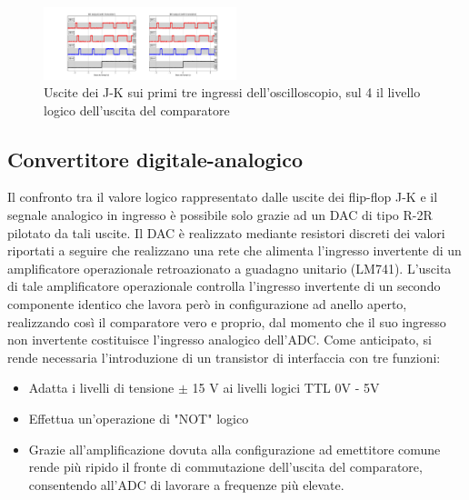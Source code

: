 \documentclass[journal]{IEEEtran}
\begin{document}
\begin{figure}[H]%
\begin{center}
\includegraphics[trim = {570 0 0 0}, clip, width=0.50\textwidth]{analysis/output/cumulative_BIT_with_transistor.pdf}
\caption{Uscite dei J-K sui primi tre ingressi dell'oscilloscopio, sul 4 il livello logico dell'uscita del comparatore}
\label{fig:Comparator-output}
\end{center}
\end{figure}

\subsection{Convertitore digitale-analogico}
Il confronto tra il valore logico rappresentato dalle uscite dei flip-flop J-K e il segnale analogico in ingresso è possibile solo grazie ad un DAC di tipo R-2R pilotato da tali uscite. Il DAC è realizzato mediante resistori discreti dei valori riportati a seguire che realizzano una rete che alimenta l'ingresso invertente di un amplificatore operazionale retroazionato a guadagno unitario (LM741). L'uscita di tale amplificatore operazionale controlla l'ingresso invertente di un secondo componente identico che lavora però in configurazione ad anello aperto, realizzando così il comparatore vero e proprio, dal momento che il suo ingresso non invertente costituisce l'ingresso analogico dell'ADC. Come anticipato, si rende necessaria l'introduzione di un transistor di interfaccia con tre funzioni:
\begin{itemize}
    \item Adatta i livelli di tensione $\pm$ 15 V ai livelli logici TTL 0V - 5V
    \item Effettua un'operazione di "NOT" logico
    \item Grazie all'amplificazione dovuta alla configurazione ad emettitore comune rende più ripido il fronte di commutazione dell'uscita del comparatore, consentendo all'ADC di lavorare a frequenze più elevate.
\end{itemize}
\end{document}
